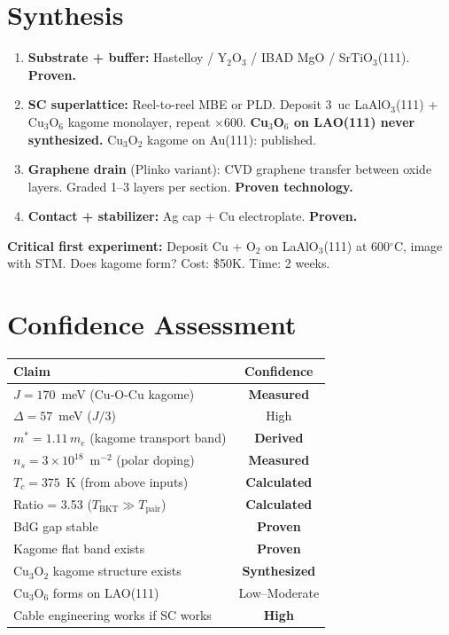 \documentclass[11pt, a4paper]{article}
\begin{document}
\section{Synthesis}

\begin{enumerate}
  \item \textbf{Substrate + buffer:} Hastelloy / Y$_2$O$_3$ /
        IBAD MgO / SrTiO$_3$(111).
        \textcolor{nm-green}{\textbf{Proven.}}

  \item \textbf{SC superlattice:} Reel-to-reel MBE or PLD.
        Deposit 3~uc LaAlO$_3$(111) + Cu$_3$O$_6$ kagome
        monolayer, repeat $\times 600$.
        \textcolor{nm-red}{\textbf{Cu$_3$O$_6$ on LAO(111)
        never synthesized.}} Cu$_3$O$_2$ kagome on Au(111):
        published.

  \item \textbf{Graphene drain} (Plinko variant):
        CVD graphene transfer between oxide layers.
        Graded 1--3 layers per section.
        \textcolor{nm-green}{\textbf{Proven technology.}}

  \item \textbf{Contact + stabilizer:} Ag cap + Cu electroplate.
        \textcolor{nm-green}{\textbf{Proven.}}
\end{enumerate}

\textbf{Critical first experiment:} Deposit Cu + O$_2$ on
LaAlO$_3$(111) at 600$^\circ$C, image with STM. Does kagome
form? Cost: \$50K. Time: 2 weeks.

\section{Confidence Assessment}

\begin{center}
\begin{tabular}{@{}lc@{}}
\toprule
\textbf{Claim} & \textbf{Confidence} \\
\midrule
$J = 170$~meV (Cu-O-Cu kagome) & \textbf{Measured} \\
$\Delta = 57$~meV ($J/3$) & High \\
$m^* = 1.11\,m_e$ (kagome transport band) & \textbf{Derived} \\
$n_s = 3 \times 10^{18}$~m$^{-2}$ (polar doping) & \textbf{Measured} \\
$T_c = 375$~K (from above inputs) & \textbf{Calculated} \\
Ratio = 3.53 ($T_{\text{BKT}} \gg T_{\text{pair}}$) &
  \textbf{Calculated} \\
BdG gap stable & \textbf{Proven} \\
Kagome flat band exists & \textbf{Proven} \\
Cu$_3$O$_2$ kagome structure exists & \textbf{Synthesized} \\
Cu$_3$O$_6$ forms on LAO(111) & Low--Moderate \\
Cable engineering works if SC works & \textbf{High} \\
\bottomrule
\end{tabular}
\end{center}
\end{document}
